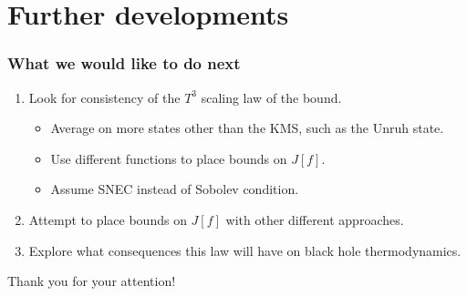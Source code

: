 \documentclass[handout]{beamer}
\begin{document}
	\section{Further developments}
	\begin{frame}
		\frametitle{What we would like to do next}
		\begin{enumerate}

			\item Look for consistency of the \(T^3\) scaling law of the bound. 
				\begin{itemize}
					\item Average on more states other than the KMS, such as the Unruh state.
					\item Use different functions to place bounds on \(J[f]\).
					\item Assume SNEC instead of Sobolev condition.
				\end{itemize}
			\item  Attempt to place bounds on \(J[f]\) with other different approaches.
			\item Explore what consequences this law will have on black hole thermodynamics.
		\end{enumerate}

		\vskip 22pt

		{\Huge
		\textcolor{turquoise!80!black}{Thank you for your attention!}}
	\end{frame}
\end{document}
